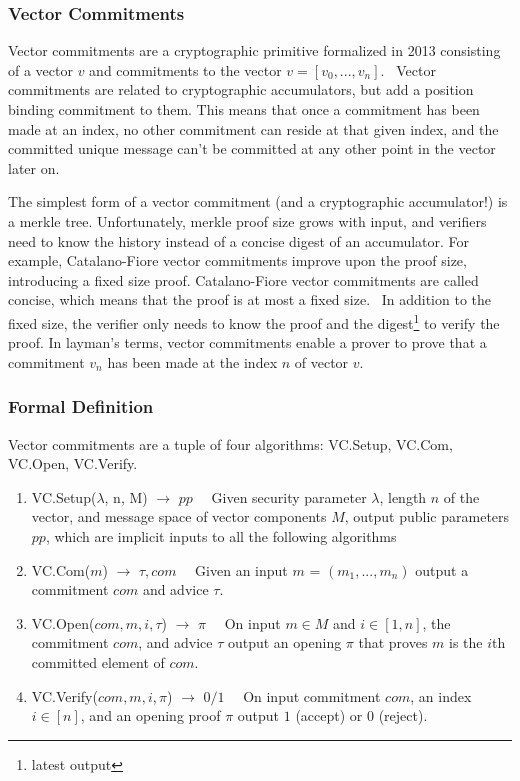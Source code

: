 \subsubsection{Vector Commitments}
Vector commitments are a cryptographic primitive formalized in 2013 consisting of a vector \(v\) and commitments to the vector \(v = [v_0, ... ,v_n]\).~\cite{Catalano2013-jn} Vector commitments are related to cryptographic accumulators, but add a position binding commitment to them. This means that once a commitment has been made at an index, no other commitment can reside at that given index, and the committed unique message can't be committed at any other point in the vector later on.

The simplest form of a vector commitment (and a cryptographic accumulator!) is a merkle tree. Unfortunately, merkle proof size grows with input, and verifiers need to know the history instead of a concise digest of an accumulator. For example, Catalano-Fiore vector commitments improve upon the proof size, introducing a fixed size proof. Catalano-Fiore vector commitments are called concise, which means that the proof is at most a fixed size.~\cite{Catalano2013-jn} In addition to the fixed size, the verifier only needs to know the proof and the digest\footnote{latest output} to verify the proof. In layman's terms, vector commitments enable a prover to prove that a commitment \(v_n\) has been made at the index \(n\) of vector \(v\).

\subsubsection{Formal Definition}
Vector commitments are a tuple of four algorithms: VC.Setup, VC.Com, VC.Open, VC.Verify.~\cite{Boneh2019-tk}

\begin{enumerate}

  \item VC.Setup(\(\lambda\), n, M) \(\rightarrow\) \(pp\quad\) Given security parameter \(\lambda\), length \(n\) of the vector, and message space of vector components \(M\), output public parameters \(pp\), which are implicit inputs to all the following algorithms

  \item VC.Com(\(m\)) \(\rightarrow\) \(\tau, com\quad\) Given an input \(m\) = \((m_1, ..., m_n)\) output a commitment \(com\) and advice \(\tau\).

  \item VC.Open(\(com, m, i, \tau\)) \(\rightarrow\) \(\pi\quad\) On input \(m \in M\) and \(i \in [1, n]\), the commitment \(com\), and advice \(\tau\) output an opening \(\pi\) that proves \(m\) is the \(i\)th committed element of \(com\).

  \item VC.Verify(\(com, m, i, \pi\)) \(\rightarrow\) \(0/1\quad\) On input commitment \(com\), an index \(i \in [n]\), and an opening proof \(\pi\) output \(1\) (accept) or \(0\) (reject).

\end{enumerate}

